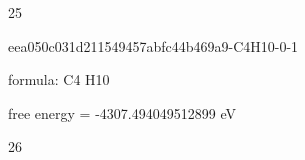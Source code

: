 \documentclass{article}
\begin{document}
25

\vspace{1cm}


eea050c031d211549457abfc44b469a9-C4H10-0-1



formula: C4 H10



free energy = -4307.494049512899 eV

26
\end{document}
